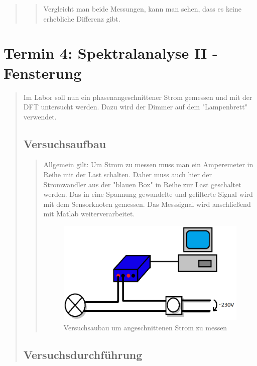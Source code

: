 \begin{quote}
\begin{quote}
	Vergleicht man beide Messungen, kann man sehen, dass es keine erhebliche
	Differenz gibt.
	
	 
	\end{quote}
\end{quote}

\section{Termin 4: Spektralanalyse II - Fensterung}
\begin{quote}

	Im Labor soll nun ein phasenangeschnittener Strom gemessen und mit der DFT untersucht werden.
	Dazu wird der Dimmer auf dem "Lampenbrett" verwendet.
	
	\subsection{Versuchsaufbau}
	\begin{quote}
    	Allgemein gilt: Um Strom zu messen muss man ein Amperemeter in Reihe mit der Last schalten. 
    	Daher muss auch hier der Stromwandler aus der "blauen Box" in Reihe zur Last geschaltet 
    	werden. Das in eine Spannung gewandelte und gefilterte Signal wird mit dem Sensorknoten gemessen. 
    	Das Messsignal wird anschließend mit Matlab weiterverarbeitet.
    
    	\begin{figure}[htb]
        	\centering
        	\includegraphics[scale=0.6,  trim = 0cm 0cm 0cm 0cm,clip]{./Bilder/Versuchsaufbau1}
        	\caption{Versuchsaubau um angeschnittenen Strom zu messen}
    	\end{figure}	
	\end{quote}
	
	\subsection{Versuchsdurchführung}
	\begin{quote}
		        

\end{quote}
\end{quote}
